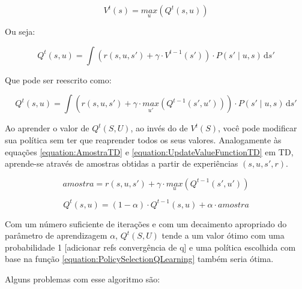 \begin{equation}
    V^t \left( s \right) = \underset{u}{max} \left( Q^t \left( s, u \right) \right)
\end{equation}

Ou seja:

\begin{equation} \label{equation:QValueFunctionQLearning}
    Q^t \left( s, u \right) = \int \! \left( r \left( s, u, s' \right) + \gamma \cdot V^{t-1} \left( s' \right) \right) \cdot P \left( s' \mid u, s \right) \, \mathrm{d}s'
\end{equation}

Que pode ser reescrito como:

\begin{equation} \label{equation:QValueFunctionQLearningFinal}
    Q^t \left( s, u \right) = \int \! \left( r \left( s, u, s' \right) + \gamma \cdot \underset{u'}{max} \left( Q^{t-1} \left( s', u' \right) \right) \right) \cdot P \left( s' \mid u, s \right) \, \mathrm{d}s'
\end{equation}

Ao aprender o valor de $ Q^t \left( S, U \right) $, ao invés do de $ V^t \left( S \right) $, você pode modificar sua política sem ter que reaprender todos os seus valores. Analogamente às equações \ref{equation:AmostraTD} e \ref{equation:UpdateValueFunctionTD} em TD, aprende-se através de amostras obtidas a partir de experiências $ \left( s, u, s', r \right) $.


\begin{equation}
	amostra = r \left( s, u, s' \right) + \gamma \cdot \underset{u}{max} \left( Q^{t-1} \left( s', u' \right) \right)
\end{equation}

\begin{equation}
	Q^t \left( s, u \right) = \left( 1 - \alpha \right) \cdot Q^{t-1} \left( s, u \right) + \alpha \cdot amostra
\end{equation}

Com um número suficiente de iterações e com um decaimento apropriado do parâmetro de aprendizagem $ \alpha $, $ Q^t \left( S, U \right) $ tende a um valor ótimo  com uma probabilidade 1 [adicionar refs convergência de q] e uma política escolhida com base na função \ref{equation:PolicySelectionQLearning} também seria ótima.

Alguns problemas com esse algoritmo são:

